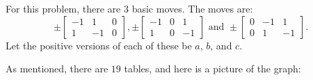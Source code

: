 For this problem, there are 3 basic moves.  The moves are:
$$
 \pm \left[
\begin{array}{ccc}
-1&1&0\\1&-1&0
\end{array}
\right],
\pm \left[
\begin{array}{ccc}
-1 & 0 & 1 \\ 1 & 0 & -1
\end{array}
\right]
\text{ and  } 
\pm \left[
\begin{array}{ccc}
0&-1&1\\0&1&-1
\end{array}
\right]
.
$$
Let the positive versions of each of these be $a$, $b$, and $c$.

As mentioned, there are $19$ tables, and here is a picture of the graph:



